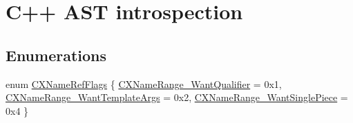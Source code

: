 \hypertarget{group__CINDEX__CPP}{}\section{C++ A\+ST introspection}
\label{group__CINDEX__CPP}
\subsection*{Enumerations}
\begin{DoxyCompactItemize}
\item 
enum \mbox{\hyperlink{group__CINDEX__CPP_gab9c36c971a7241dccf6a54741b66a5ee}{C\+X\+Name\+Ref\+Flags}} \{ \mbox{\hyperlink{group__CINDEX__CPP_ggab9c36c971a7241dccf6a54741b66a5eea9f7f2c26ed147d0c85b475f66d5213e3}{C\+X\+Name\+Range\+\_\+\+Want\+Qualifier}} = 0x1, 
\mbox{\hyperlink{group__CINDEX__CPP_ggab9c36c971a7241dccf6a54741b66a5eea286e77db7ed354a06309770f1a8e6efd}{C\+X\+Name\+Range\+\_\+\+Want\+Template\+Args}} = 0x2, 
\mbox{\hyperlink{group__CINDEX__CPP_ggab9c36c971a7241dccf6a54741b66a5eea4a5d0e263577af7d7a0ba46ad0dcf8d8}{C\+X\+Name\+Range\+\_\+\+Want\+Single\+Piece}} = 0x4
 \}
\end{DoxyCompactItemize}

